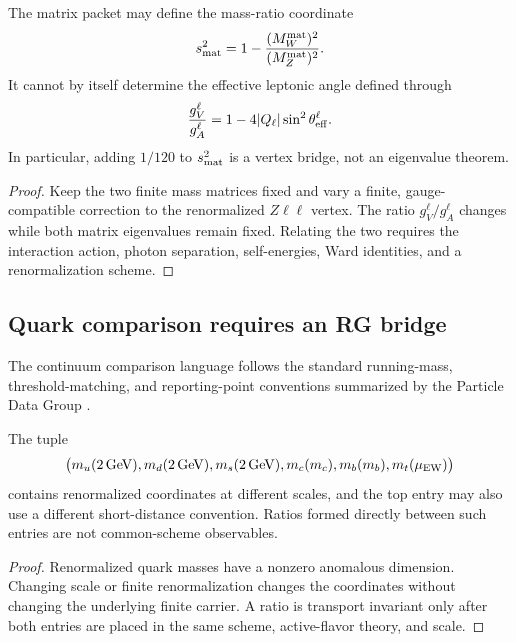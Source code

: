 \documentclass[12pt,a4paper]{article}
\newcommand{\pvcite}[1]{\cite{#1}}
\begin{document}
\begin{theorem}
\label{p6:thm:effective-angle-no-go}
The matrix packet may define the mass-ratio coordinate
\[
s_{\rm mat}^2
=1-\frac{(M_W^{\rm mat})^2}{(M_Z^{\rm mat})^2}.
\]
It cannot by itself determine the effective leptonic angle defined through
\[
\frac{g_V^\ell}{g_A^\ell}
=1-4|Q_\ell|\sin^2\theta_{\rm eff}^{\ell}.
\]
In particular, adding \(1/120\) to \(s_{\rm mat}^2\) is a vertex bridge, not
an eigenvalue theorem.
\end{theorem}

\begin{proof}
Keep the two finite mass matrices fixed and vary a finite, gauge-compatible
correction to the renormalized \(Z\ell\ell\) vertex.  The ratio
\(g_V^\ell/g_A^\ell\) changes while both matrix eigenvalues remain fixed.
Relating the two requires the interaction action, photon separation,
self-energies, Ward identities, and a renormalization scheme.
\end{proof}

\subsection{Quark comparison requires an RG bridge}
\label{p6:sec:qrg}

The continuum comparison language follows the standard running-mass,
threshold-matching, and reporting-point conventions summarized by the
Particle Data Group \pvcite{PDG2024}.

\begin{theorem}
\label{p6:thm:mixed-quark-reporting}
The tuple
\[
\bigl(
m_u(2\,{\rm GeV}),m_d(2\,{\rm GeV}),m_s(2\,{\rm GeV}),
m_c(m_c),m_b(m_b),m_t(\mu_{\rm EW})
\bigr)
\]
contains renormalized coordinates at different scales, and the top entry may
also use a different short-distance convention.  Ratios formed directly
between such entries are not common-scheme observables.
\end{theorem}

\begin{proof}
Renormalized quark masses have a nonzero anomalous dimension.  Changing scale
or finite renormalization changes the coordinates without changing the
underlying finite carrier.  A ratio is transport invariant only after both
entries are placed in the same scheme, active-flavor theory, and scale.
\end{proof}
\end{document}

